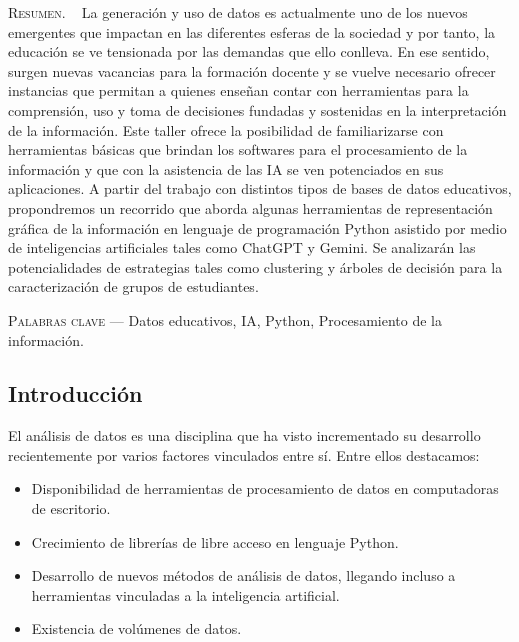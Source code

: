 \begin{center}
	\begin{minipage}{0.75\linewidth} \small
		\textsc{Resumen}. ~
		La generación y uso de datos es actualmente uno de los nuevos emergentes que impactan en las diferentes esferas de la sociedad y por tanto, la educación se ve tensionada por las demandas que ello conlleva. En ese sentido, surgen nuevas vacancias para la formación docente y se vuelve necesario ofrecer instancias que permitan a quienes enseñan contar con herramientas para la comprensión, uso y toma de decisiones fundadas y sostenidas en la interpretación de la información. Este taller ofrece la posibilidad de familiarizarse con herramientas básicas que brindan los softwares para el procesamiento de la información y que con la asistencia de las IA se ven potenciados en sus aplicaciones. A partir del trabajo con distintos tipos de bases de datos educativos, propondremos un recorrido que aborda algunas herramientas de representación gráfica de la información en lenguaje de programación Python asistido por medio de inteligencias artificiales tales como ChatGPT y Gemini. Se analizarán las potencialidades de estrategias tales como clustering y árboles de decisión para la caracterización de grupos de estudiantes.
	\end{minipage}
	
	\vspace{0.5em}
	
	\begin{minipage}{0.75\linewidth} \small
		\textsc{Palabras clave} --- Datos educativos, IA, Python, Procesamiento de la información.
	\end{minipage}
\end{center}

\subsection{Introducción}

El análisis de datos es una disciplina que ha visto incrementado su desarrollo recientemente por varios factores vinculados entre sí. Entre ellos destacamos:

\begin{itemize}
	\item Disponibilidad de herramientas de procesamiento de datos en computadoras de escritorio.
	\item Crecimiento de librerías de libre acceso en lenguaje Python.
	\item Desarrollo de nuevos métodos de análisis de datos, llegando incluso a herramientas vinculadas a la inteligencia artificial.
	\item Existencia de volúmenes de datos.
\end{itemize}

